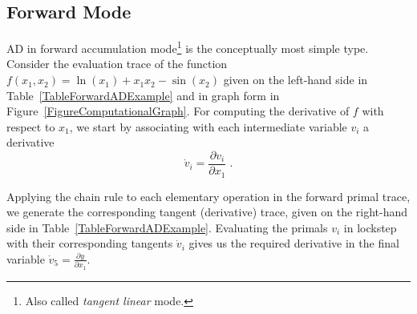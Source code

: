 \documentclass[twoside,11pt]{article}
\begin{document}
\subsection{Forward Mode}

AD in forward accumulation mode\footnote{Also called \emph{tangent linear} mode.} is the conceptually most simple type. Consider the evaluation trace of the function $f(x_1, x_2) = \ln(x_1) + x_1 x_2 - \sin(x_2)$ given on the left-hand side in Table~\ref{TableForwardADExample} and in graph form in Figure~\ref{FigureComputationalGraph}. For computing the derivative of $f$ with respect to $x_1$, we start by associating with each intermediate variable $v_i$ a derivative
\begin{equation*}
  \dot{v}_i = \frac{\partial v_i}{\partial x_1}\; .
\end{equation*}

Applying the chain rule to each elementary operation in the forward primal trace, we generate the corresponding tangent (derivative) trace, given on the right-hand side in Table~\ref{TableForwardADExample}. Evaluating the primals $v_i$ in lockstep with their corresponding tangents $\dot{v}_i$ gives us the required derivative in the final variable $\dot{v}_5=\frac{\partial y}{\partial x_1}$\;.

\end{document}
